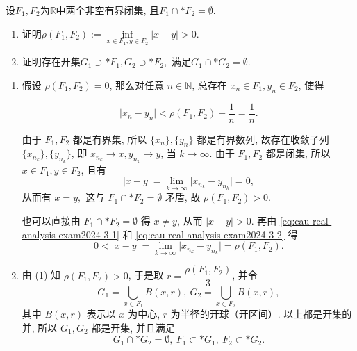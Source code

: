 
\begin{question}[points = 10]
设$F_1, F_2$为$\mathbb{R}$中两个非空有界闭集, 且$F_1 \cap* F_2 = \emptyset.$
\begin{enumerate}
\item 证明$\rho(F_1, F_2) := \inf\limits_{x\in F_1, y\in F_2} \lvert x - y \rvert > 0.$
\item 证明存在开集$G_1 \supset* F_1, G_2 \supset* F_2,$ 满足$G_1 \cap* G_2 = \emptyset.$
\end{enumerate}

\end{question}

\begin{solution}
\begin{enumerate}
\item 假设 \(\rho(F_1, F_2) = 0\), 那么对任意 \(n \in \mathbb{N}\), 总存在 \(x_n \in F_1, y_n \in F_2\), 使得

\begin{equation}
\label{eq:cau-real-analysis-exam2024-3-1}
\lvert x_n - y_n \rvert < \rho(F_1, F_2) + \dfrac{1}{n} = \dfrac{1}{n}.
\end{equation}

由于 \(F_1, F_2\) 都是有界集, 所以 \(\{x_n\}, \{y_n\}\) 都是有界数列, 故存在收敛子列 \(\{x_{n_k}\}, \{y_{n_k}\}\), 即 \(x_{n_k} \to x, y_{n_k} \to y\), 当 \(k \to \infty\). 由于 \(F_1, F_2\) 都是闭集, 所以 \(x \in F_1, y \in F_2\), 且有
\begin{equation}
\label{eq:cau-real-analysis-exam2024-3-2}
\lvert x - y \rvert = \lim\limits_{k\to\infty} \lvert x_{n_k} - y_{n_k} \rvert = 0,
\end{equation}
从而有 \(x = y,\) 这与 \(F_1 \cap* F_2 = \emptyset\) 矛盾, 故 \(\rho(F_1, F_2) > 0\).

也可以直接由 \(F_1 \cap* F_2 = \emptyset\) 得 \(x \neq y\), 从而    \(\lvert x - y \rvert > 0\). 再由 \eqref{eq:cau-real-analysis-exam2024-3-1} 和 \eqref{eq:cau-real-analysis-exam2024-3-2} 得
\[0 < \lvert x - y \rvert = \lim\limits_{k\to\infty} \lvert x_{n_k} - y_{n_k} \rvert = \rho(F_1, F_2).\]
\item 由 (1) 知 \(\rho(F_1, F_2) > 0\), 于是取 \(r = \dfrac{\rho(F_1, F_2)}{3}\), 并令
\[
G_1 = \bigcup\limits_{x\in F_1} B(x, r), ~ G_2 = \bigcup\limits_{x\in F_2} B(x, r),
\]
其中 \(B(x, r)\) 表示以 \(x\) 为中心, \(r\) 为半径的开球（开区间）. 以上都是开集的并, 所以 \(G_1, G_2\) 都是开集, 并且满足
\[G_1 \cap* G_2 = \emptyset, ~ F_1 \subset* G_1, ~ F_2 \subset* G_2.\]
\end{enumerate}
\end{solution}


